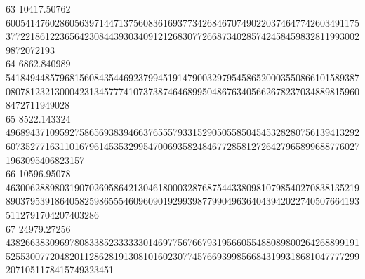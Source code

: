 \documentclass[10pt]{article}
\begin{document}
{63	10417.50762	6005414760286056397144713756083616937734268467074902203746477426034911753772218612236564230844393034091212683077266873402857424584598328119930029872072193\\
64	6862.840989	5418494485796815608435446923799451914790032979545865200035508661015893870807812321300042313457774107373874646899504867634056626782370348898159608472711949028\\
65	8522.143324	4968943710959275865693839466376555793315290505585045453282807561394132926073527716311016796145353299547006935824846772858127264279658996887760271963095406823157\\
66	10596.95078	4630062889803190702695864213046180003287687544338098107985402708381352198903795391864058259865554609609019299398779904963640439420227405076641935112791704207403286\\
67	24979.27256	4382663830969780833852333333014697756766793195660554880898002642688991915255300772048201128628191308101602307745766939985668431993186810477772992071051178415749323451\\
    }
  \normalsize
\end{document}
